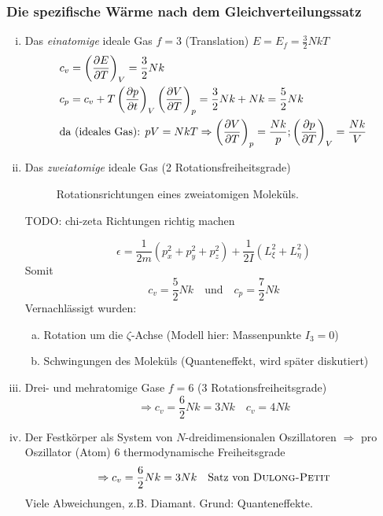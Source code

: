 \subsubsection{Die spezifische Wärme nach dem Gleichverteilungssatz}
\begin{enumerate}[i)]
    \item Das \emph{einatomige} ideale Gas $f=3$ (Translation) $E = E_f = \frac{3}{2} N k T$
    \begin{equation}
        \begin{split}
            & c_v = \left( \frac{\partial E}{\partial T} \right)_{V} = \frac{3}{2} N k \\
            & c_p = c_v + T \left( \frac{\partial p}{\partial t} \right)_{V} \left( \frac{\partial V}{\partial T} \right)_{p} = \frac{3}{2} N k + N k = \frac{5}{2} N k \\
            & \text{da (ideales Gas): } pV = N k T \Rightarrow \left( \frac{\partial V}{\partial T} \right)_{p} = \frac{N k }{p}; \left( \frac{\partial p}{\partial T} \right)_{V} = \frac{N k}{V}
        \end{split}
    \end{equation}
    \item Das \emph{zweiatomige} ideale Gas (2 Rotationsfreiheitsgrade)

\begin{figure}[H]
        \centering
        \def\svgwidth{0.5\textwidth}
        
        \caption{Rotationsrichtungen eines zweiatomigen Moleküls.}
        \label{img:2atomicGasRotationDirections}
\end{figure}

TODO: chi-zeta Richtungen richtig machen %

    \begin{equation}
        \epsilon = \frac{1}{2 m} \left( p_x^2 + p_y^2 + p_z^2 \right) + \frac{1}{2 I} \left( L_\xi^2 + L_\eta^2 \right)
    \end{equation}
    Somit
    \begin{equation}
        c_v = \frac{5}{2} N k \quad \text{und} \quad c_p = \frac{7}{2} N k
    \end{equation}
    Vernachlässigt wurden:
    \begin{enumerate}[a)]
        \item Rotation um die $\zeta$-Achse (Modell hier: Massenpunkte $I_3 = 0$)
        \item Schwingungen des Moleküls (Quanteneffekt, wird später diskutiert)
    \end{enumerate}
    \item Drei- und mehratomige Gase $f = 6$ (3 Rotationsfreiheitsgrade)
    \begin{equation}
        \Rightarrow c_v = \frac{6}{2} N k = 3 N k \quad c_v = 4 N k
    \end{equation}
    \item Der Festkörper als System von $N$-dreidimensionalen Oszillatoren $\Rightarrow$ pro Oszillator (Atom) 6 thermodynamische Freiheitsgrade
    \begin{equation}
        \Rightarrow c_v = \frac{6}{2} N k = 3 N k \quad \text{Satz von \textsc{Dulong-Petit}}
    \end{equation}
    Viele Abweichungen, z.B. Diamant. Grund: Quanteneffekte.
\end{enumerate}
